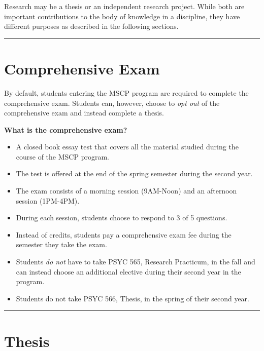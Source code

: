 \documentclass[openany]{book}
\providecommand{\tightlist}{%
  \setlength{\itemsep}{0pt}\setlength{\parskip}{0pt}}
\begin{document}
Research may be a thesis or an independent research project. While both are important contributions to the body of knowledge in a discipline, they have different purposes as described in the following sections.

\begin{center}\rule{0.5\linewidth}{0.5pt}\end{center}

\hypertarget{comprehensive-exam}{%
\section{Comprehensive Exam}\label{comprehensive-exam}}

By default, students entering the MSCP program are required to complete the comprehensive exam. Students can, however, choose to \emph{opt out} of the comprehensive exam and instead complete a thesis.

\textbf{What is the comprehensive exam?}

\begin{itemize}
\tightlist
\item
  A closed book essay test that covers all the material studied during the course
  of the MSCP program.\\
\item
  The test is offered at the end of the spring semester during the second year.
\item
  The exam consists of a morning session (9AM-Noon) and an afternoon session (1PM-4PM).
\item
  During each session, students choose to respond to 3 of 5 questions.
\item
  Instead of credits, students pay a comprehensive exam fee during the semester they
  take the exam.
\item
  Students \emph{do not} have to take PSYC 565, Research Practicum, in the fall and can instead choose an
  additional elective during their second year in the program.
\item
  Students do not take PSYC 566, Thesis, in the spring of their second year.
\end{itemize}

\begin{center}\rule{0.5\linewidth}{0.5pt}\end{center}

\hypertarget{thesis}{%
\section{Thesis}\label{thesis}}
\end{document}
